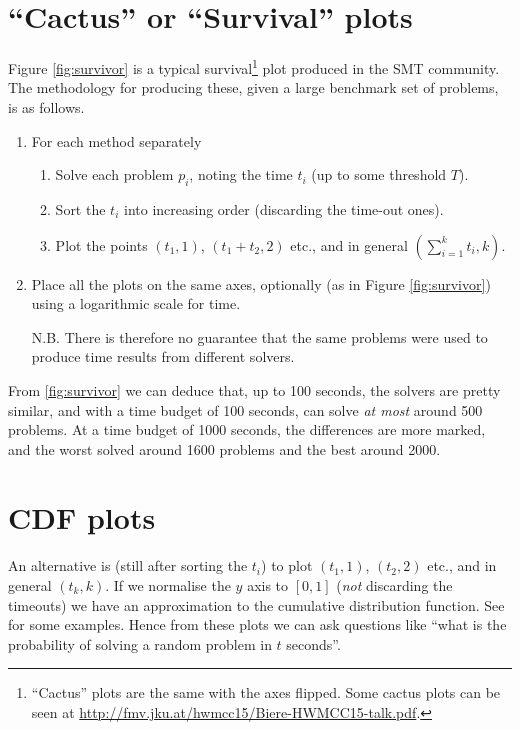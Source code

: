 \section{``Cactus'' or ``Survival'' plots}
Figure \ref{fig:survivor} is a typical survival\footnote{``Cactus'' plots are the same with the axes flipped. Some cactus plots can be seen at \url{http://fmv.jku.at/hwmcc15/Biere-HWMCC15-talk.pdf}.} plot produced in the SMT community.
The methodology for producing these, given a large benchmark set of problems, is as follows.
\begin{enumerate}
\item For each method separately
\begin{enumerate}
\item Solve each problem $p_i$, noting the time $t_i$ (up to some threshold $T$).
\item Sort the $t_i$ into increasing order (discarding the time-out ones).
\item Plot the points $(t_1,1)$, $(t_1+t_2,2)$ etc., and in general $(\sum_{i=1}^kt_i,k)$.
\end{enumerate}
\item Place all the plots on the same axes, optionally (as in Figure \ref{fig:survivor}) using a logarithmic scale for time.
\item[N.B.]There is therefore no guarantee that the same problems were used to produce time results from different solvers.
\end{enumerate}
From \ref{fig:survivor} we can deduce that, up to 100 seconds, the solvers are pretty similar, and with a time budget of 100 seconds, can solve \emph{at most} around 500 problems. At a time budget of 1000 seconds, the differences are more marked, and the worst solved around 1600 problems and the best around 2000.
\section{CDF plots}
An alternative is (still after sorting the $t_i$) to plot  $(t_1,1)$, $(t_2,2)$ etc., and in general $(t_k,k)$. If we normalise the $y$ axis to $[0,1]$ (\emph{not} discarding the timeouts) we have an approximation to the cumulative distribution function. See \cite{Xuetal2008b} for some examples. Hence from these plots we can ask questions like ``what is the probability of solving a random problem in $t$ seconds''.

